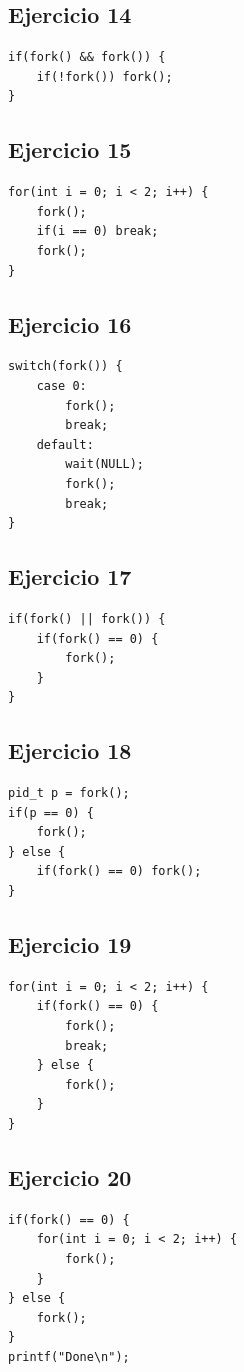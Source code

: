 \documentclass[12pt,a4paper]{article}
\begin{document}
\subsection*{Ejercicio 14}
\begin{lstlisting}
if(fork() && fork()) {
    if(!fork()) fork();
}
\end{lstlisting}

\subsection*{Ejercicio 15}
\begin{lstlisting}
for(int i = 0; i < 2; i++) {
    fork();
    if(i == 0) break;
    fork();
}
\end{lstlisting}

\subsection*{Ejercicio 16}
\begin{lstlisting}
switch(fork()) {
    case 0:
        fork();
        break;
    default:
        wait(NULL);
        fork();
        break;
}
\end{lstlisting}

\subsection*{Ejercicio 17}
\begin{lstlisting}
if(fork() || fork()) {
    if(fork() == 0) {
        fork();
    }
}
\end{lstlisting}

\subsection*{Ejercicio 18}
\begin{lstlisting}
pid_t p = fork();
if(p == 0) {
    fork();
} else {
    if(fork() == 0) fork();
}
\end{lstlisting}

\subsection*{Ejercicio 19}
\begin{lstlisting}
for(int i = 0; i < 2; i++) {
    if(fork() == 0) {
        fork();
        break;
    } else {
        fork();
    }
}
\end{lstlisting}

\newpage
\subsection*{Ejercicio 20}
\begin{lstlisting}
if(fork() == 0) {
    for(int i = 0; i < 2; i++) {
        fork();
    }
} else {
    fork();
}
printf("Done\n");
\end{lstlisting}
\end{document}
